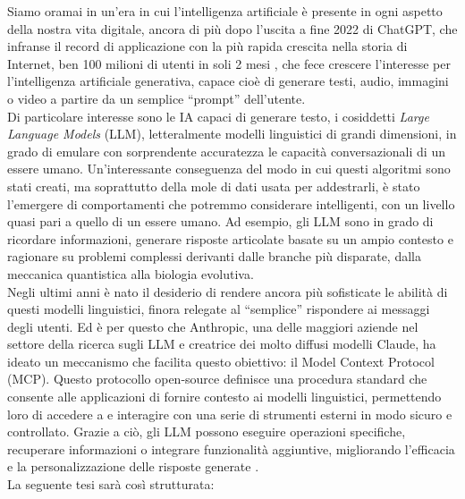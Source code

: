 ﻿Siamo oramai in un'era in cui l'intelligenza artificiale è presente in ogni aspetto della nostra vita digitale,
ancora di più dopo l'uscita a fine 2022 di ChatGPT, che infranse il record di applicazione con la più rapida crescita nella storia di Internet,
ben 100 milioni di utenti in soli 2 mesi \cite{ubs2023latest}, che fece crescere l'interesse per l'intelligenza
artificiale generativa, capace cioè di generare testi, audio, immagini o video a partire da un semplice “prompt” dell'utente. \\
Di particolare interesse sono le IA capaci di generare testo, i cosiddetti \textit{Large Language Models} (LLM), letteralmente modelli linguistici
di grandi dimensioni, in grado di emulare con sorprendente accuratezza le capacità conversazionali di un essere umano. Un'interessante
conseguenza del modo in cui questi algoritmi sono stati creati, ma soprattutto della mole di dati usata per addestrarli, è stato l'emergere
di comportamenti che potremmo considerare intelligenti, con un livello quasi pari a quello di un essere umano. Ad esempio, gli LLM sono
in grado di ricordare informazioni, generare risposte articolate basate su un ampio contesto e ragionare su problemi complessi derivanti
dalle branche più disparate, dalla meccanica quantistica alla biologia evolutiva. \\
Negli ultimi anni è nato il desiderio di rendere ancora più sofisticate le abilità di questi modelli linguistici, finora relegate al
“semplice” rispondere ai messaggi degli utenti. Ed è per questo che Anthropic, una delle maggiori aziende nel settore della ricerca sugli LLM
e creatrice dei molto diffusi modelli Claude, ha ideato un meccanismo che facilita questo obiettivo: il Model Context Protocol (MCP).
Questo protocollo open-source definisce una procedura standard che consente alle applicazioni di fornire contesto ai modelli linguistici,
permettendo loro di accedere a e interagire con una serie di strumenti esterni in modo sicuro e controllato. Grazie a ciò, gli LLM possono
eseguire operazioni specifiche, recuperare informazioni o integrare funzionalità aggiuntive, migliorando l'efficacia e la personalizzazione
delle risposte generate \cite{modelcontextprotocol2024}. \\
La seguente tesi sarà così strutturata:
